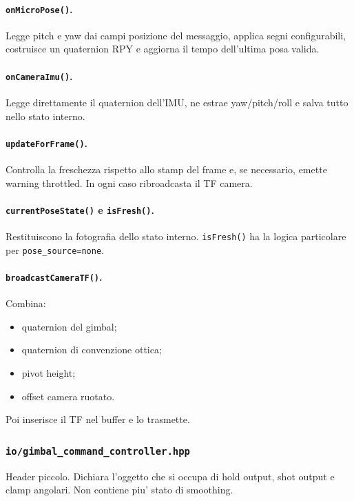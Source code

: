 \documentclass[11pt,a4paper]{article}
\newcommand{\code}[1]{\texttt{#1}}
\begin{document}
\paragraph{\code{onMicroPose()}.}
Legge pitch e yaw dai campi posizione del messaggio, applica segni configurabili, costruisce un quaternion RPY e aggiorna il tempo dell'ultima posa valida.

\paragraph{\code{onCameraImu()}.}
Legge direttamente il quaternion dell'IMU, ne estrae yaw/pitch/roll e salva tutto nello stato interno.

\paragraph{\code{updateForFrame()}.}
Controlla la freschezza rispetto allo stamp del frame e, se necessario, emette warning throttled. In ogni caso ribroadcasta il TF camera.

\paragraph{\code{currentPoseState()} e \code{isFresh()}.}
Restituiscono la fotografia dello stato interno. \code{isFresh()} ha la logica particolare per \code{pose\_source=none}.

\paragraph{\code{broadcastCameraTF()}.}
Combina:
\begin{itemize}[leftmargin=1.4em]
  \item quaternion del gimbal;
  \item quaternion di convenzione ottica;
  \item pivot height;
  \item offset camera ruotato.
\end{itemize}
Poi inserisce il TF nel buffer e lo trasmette.

\subsubsection{\code{io/gimbal\_command\_controller.hpp}}

Header piccolo. Dichiara l'oggetto che si occupa di hold output, shot output e clamp angolari. Non contiene piu' stato di smoothing.
\end{document}
